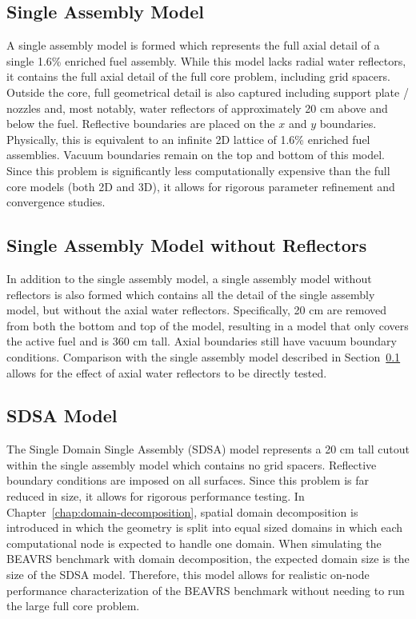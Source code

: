 \subsection{Single Assembly Model}
\label{sec:beavrs-single-assembly}

A single assembly model is formed which represents the full axial detail of a single 1.6\% enriched fuel assembly. While this model lacks radial water reflectors, it contains the full axial detail of the full core problem, including grid spacers. Outside the core, full geometrical detail is also captured including support plate / nozzles and, most notably, water reflectors of approximately 20 cm above and below the fuel. Reflective boundaries are placed on the $x$ and $y$ boundaries. Physically, this is equivalent to an infinite 2D lattice of 1.6\% enriched fuel assemblies. Vacuum boundaries remain on the top and bottom of this model. Since this problem is significantly less computationally expensive than the full core models (both 2D and 3D), it allows for rigorous parameter refinement and convergence studies.

\subsection{Single Assembly Model without Reflectors}
\label{sec:trunc-single-assembly}

In addition to the single assembly model, a single assembly model without reflectors is also formed which contains all the detail of the single assembly model, but without the axial water reflectors. Specifically, 20 cm are removed from both the bottom and top of the model, resulting in a model that only covers the active fuel and is 360 cm tall. Axial boundaries still have vacuum boundary conditions. Comparison with the single assembly model described in Section~\ref{sec:beavrs-single-assembly} allows for the effect of axial water reflectors to be directly tested.

\subsection{SDSA Model}
\label{sec:sdsa}

The Single Domain Single Assembly (SDSA) model represents a 20 cm tall cutout within the single assembly model which contains no grid spacers. Reflective boundary conditions are imposed on all surfaces. Since this problem is far reduced in size, it allows for rigorous performance testing. In Chapter~\ref{chap:domain-decomposition}, spatial domain decomposition is introduced in which the geometry is split into equal sized domains in which each computational node is expected to handle one domain. When simulating the BEAVRS benchmark with domain decomposition, the expected domain size is the size of the SDSA model. Therefore, this model allows for realistic on-node performance characterization of the BEAVRS benchmark without needing to run the large full core problem.

